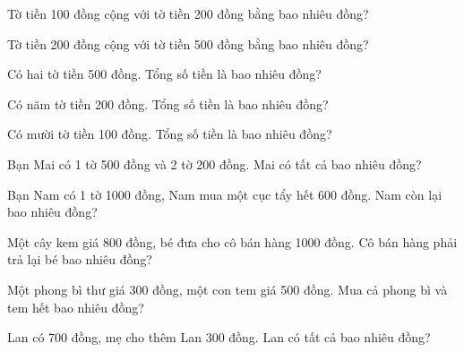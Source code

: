 \begin{ex}
Tờ tiền 100 đồng cộng với tờ tiền 200 đồng bằng bao nhiêu đồng?
\end{ex}

\begin{ex}
Tờ tiền 200 đồng cộng với tờ tiền 500 đồng bằng bao nhiêu đồng?
\end{ex}

\begin{ex}
Có hai tờ tiền 500 đồng. Tổng số tiền là bao nhiêu đồng?
\end{ex}

\begin{ex}
Có năm tờ tiền 200 đồng. Tổng số tiền là bao nhiêu đồng?
\end{ex}

\begin{ex}
Có mười tờ tiền 100 đồng. Tổng số tiền là bao nhiêu đồng?
\end{ex}

\begin{ex}
Bạn Mai có 1 tờ 500 đồng và 2 tờ 200 đồng. Mai có tất cả bao nhiêu đồng?
\end{ex}

\begin{ex}
Bạn Nam có 1 tờ 1000 đồng, Nam mua một cục tẩy hết 600 đồng. Nam còn lại bao nhiêu đồng?
\end{ex}

\begin{ex}
Một cây kem giá 800 đồng, bé đưa cho cô bán hàng 1000 đồng. Cô bán hàng phải trả lại bé bao nhiêu đồng?
\end{ex}

\begin{ex}
Một phong bì thư giá 300 đồng, một con tem giá 500 đồng. Mua cả phong bì và tem hết bao nhiêu đồng?
\end{ex}

\begin{ex}
Lan có 700 đồng, mẹ cho thêm Lan 300 đồng. Lan có tất cả bao nhiêu đồng?
\end{ex}

